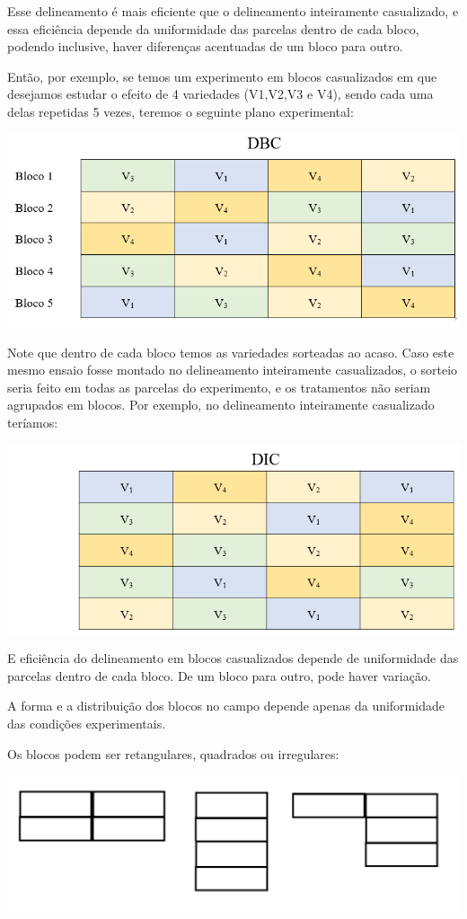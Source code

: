 \documentclass[
]{book}
\begin{document}
Esse delineamento é mais eficiente que o delineamento inteiramente casualizado, e essa eficiência depende da uniformidade das parcelas dentro de cada bloco, podendo inclusive, haver diferenças acentuadas de um bloco para outro.

Então, por exemplo, se temos um experimento em blocos casualizados em que desejamos estudar o efeito de 4 variedades (V1,V2,V3 e V4), sendo cada uma delas repetidas 5 vezes, teremos o seguinte plano experimental:

\includegraphics{DBC_d.png}

Note que dentro de cada bloco temos as variedades sorteadas ao acaso. Caso este mesmo ensaio fosse montado no delineamento inteiramente casualizados, o sorteio seria feito em todas as parcelas do experimento, e os tratamentos não seriam agrupados em blocos. Por exemplo, no delineamento inteiramente casualizado teríamos:

\includegraphics{DIC_d.png}

E eficiência do delineamento em blocos casualizados depende de uniformidade das parcelas dentro de cada bloco. De um bloco para outro, pode haver variação.

A forma e a distribuição dos blocos no campo depende apenas da uniformidade das condições experimentais.

Os blocos podem ser retangulares, quadrados ou irregulares:

\includegraphics{blocos.jpg}
\end{document}
